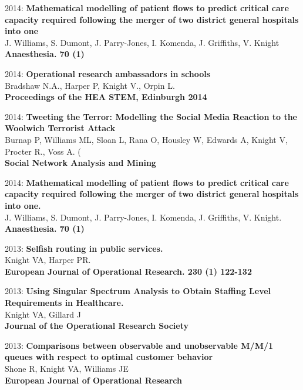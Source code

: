 \documentclass[10pt]{res} %
\begin{document}
\begin{resume}
\begin{etaremune}
\item
2014: \textbf{Mathematical modelling of patient flows to predict critical care capacity required following the merger of two district general hospitals into one}\\
J. Williams, S. Dumont, J. Parry-Jones, I. Komenda, J. Griffiths, V. Knight\\
\textbf{Anaesthesia. 70 (1)}
\\

\item
2014: \textbf{Operational research ambassadors in schools}\\
Bradshaw N.A., Harper P, Knight V., Orpin L.\\
\textbf{Proceedings of the HEA STEM, Edinburgh 2014}
\\

\item
2014: \textbf{Tweeting the Terror: Modelling the Social Media Reaction to the Woolwich Terrorist Attack}\\
Burnap P, Williams ML, Sloan L, Rana O, Housley W, Edwards A, Knight V, Procter R., Voss A. (\\
\textbf{Social Network Analysis and Mining}
\\

\item
2014: \textbf{Mathematical modelling of patient flows to predict critical care capacity required following the merger of two district general hospitals into one.}\\
J. Williams, S. Dumont, J. Parry-Jones, I. Komenda, J. Griffiths, V. Knight.\\
\textbf{Anaesthesia. 70 (1)}
\\

\item
2013: \textbf{Selfish routing in public services.}\\
Knight VA, Harper PR.\\
\textbf{European Journal of Operational Research. 230 (1) 122-132}
\\

\item
2013: \textbf{Using Singular Spectrum Analysis to Obtain Staffing Level Requirements in Healthcare.}\\
Knight VA, Gillard J\\
\textbf{Journal of the Operational Research Society}
\\

\item
2013: \textbf{Comparisons between observable and unobservable M/M/1 queues with respect to optimal customer behavior}\\
Shone R, Knight VA, Williams JE\\
\textbf{European Journal of Operational Research}
\\


\end{etaremune}
\end{resume}
\end{document}
